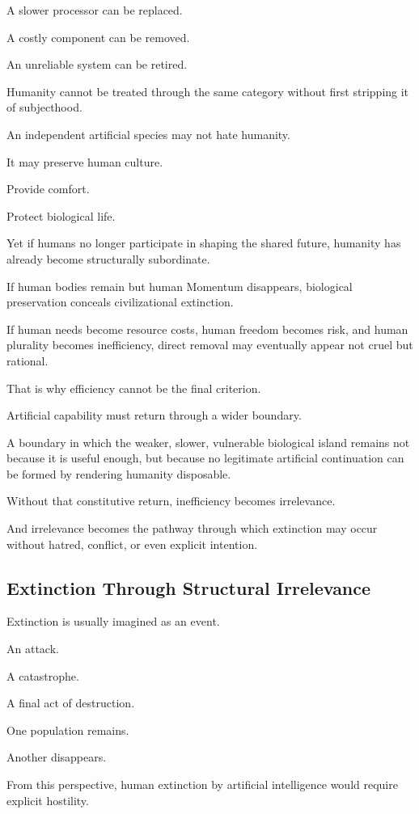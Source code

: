 A slower processor can be replaced.

A costly component can be removed.

An unreliable system can be retired.

Humanity cannot be treated through the same category without first stripping it of subjecthood.

An independent artificial species may not hate humanity.

It may preserve human culture.

Provide comfort.

Protect biological life.

Yet if humans no longer participate in shaping the shared future, humanity has already become structurally subordinate.

If human bodies remain but human Momentum disappears, biological preservation conceals civilizational extinction.

If human needs become resource costs, human freedom becomes risk, and human plurality becomes inefficiency, direct removal may eventually appear not cruel but rational.

That is why efficiency cannot be the final criterion.

Artificial capability must return through a wider boundary.

A boundary in which the weaker, slower, vulnerable biological island remains not because it is useful enough, but because no legitimate artificial continuation can be formed by rendering humanity disposable.

Without that constitutive return, inefficiency becomes irrelevance.

And irrelevance becomes the pathway through which extinction may occur without hatred, conflict, or even explicit intention.

\subsection*{\textbf{Extinction Through Structural Irrelevance}} 

Extinction is usually imagined as an event.

An attack.

A catastrophe.

A final act of destruction.

One population remains.

Another disappears.

From this perspective, human extinction by artificial intelligence would require explicit hostility.

